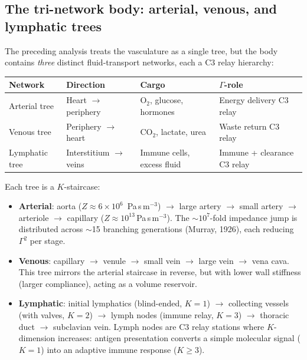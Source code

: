 \documentclass[aps,pre,twocolumn,superscriptaddress,floatfix]{revtex4-2}
\begin{document}
\subsection{The tri-network body: arterial, venous,
  and lymphatic trees}
\label{sec:tri-network}

The preceding analysis treats the vasculature as a
single tree, but the body contains \emph{three}
distinct fluid-transport networks, each a C3 relay
hierarchy:

\begin{center}
\begin{tabular}{llll}
\toprule
Network & Direction & Cargo & $\Gamma$-role \\
\midrule
Arterial tree &
  Heart $\to$ periphery &
  O$_2$, glucose, hormones &
  Energy delivery C3 relay \\
Venous tree &
  Periphery $\to$ heart &
  CO$_2$, lactate, urea &
  Waste return C3 relay \\
Lymphatic tree &
  Interstitium $\to$ veins &
  Immune cells, excess fluid &
  Immune + clearance C3 relay \\
\bottomrule
\end{tabular}
\end{center}

Each tree is a $K$-staircase:
\begin{itemize}
  \item \textbf{Arterial}: aorta ($Z \approx 6 \times 10^6$\,
    Pa\,s\,m$^{-3}$) $\to$ large artery $\to$ small artery
    $\to$ arteriole $\to$ capillary
    ($Z \approx 10^{13}$\,Pa\,s\,m$^{-3}$).
    The $\sim 10^7$-fold impedance jump is distributed
    across $\sim$15 branching generations
    (Murray, 1926), each reducing $\Gamma^2$ per stage.
  \item \textbf{Venous}: capillary $\to$ venule $\to$
    small vein $\to$ large vein $\to$ vena cava.
    This tree mirrors the arterial staircase in reverse,
    but with lower wall stiffness (larger compliance),
    acting as a volume reservoir.
  \item \textbf{Lymphatic}: initial lymphatics
    (blind-ended, $K=1$) $\to$
    collecting vessels (with valves, $K=2$) $\to$
    lymph nodes (immune relay, $K=3$) $\to$
    thoracic duct $\to$ subclavian vein.
    Lymph nodes are C3 relay stations where
    $K$-dimension increases: antigen presentation
    converts a simple molecular signal ($K=1$) into
    an adaptive immune response ($K \geq 3$).
\end{itemize}
\end{document}
